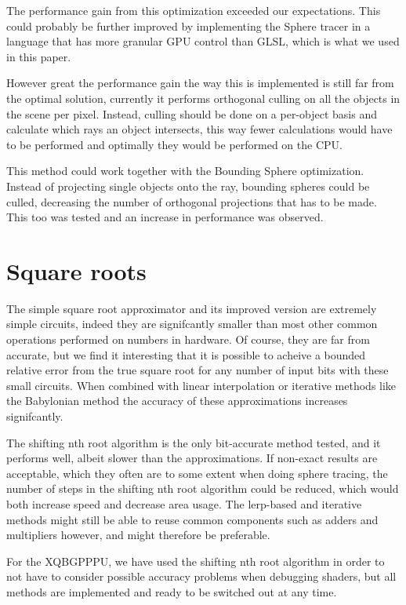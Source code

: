 			The performance gain from this optimization exceeded our 
			expectations. This could probably be further improved by 
			implementing the Sphere tracer in a language that has more granular 
			GPU control than GLSL, which is what we used in this paper.

			However great the performance gain the way this is implemented is still
			far from the optimal solution, currently it performs orthogonal culling
			on all the objects in the scene per pixel. Instead, culling should be
			done on a per-object basis and calculate which rays an object intersects,
			this way fewer calculations would have to be performed and optimally they
			would be performed on the CPU.

			This method could work together with the Bounding Sphere
			optimization. Instead of projecting single objects onto the ray,
			bounding spheres could be culled, decreasing the number of
			orthogonal projections that has to be made. This too was tested and
			an increase in performance was observed.

	\section{Square roots}

		The simple square root approximator and its improved version are
		extremely simple circuits, indeed they are signifcantly smaller than
		most other common operations performed on numbers in hardware. Of
		course, they are far from accurate, but we find it interesting that it
		is possible to acheive a bounded relative error from the true square
		root for any number of input bits with these small circuits. When
		combined with linear interpolation or iterative methods like the
		Babylonian method the accuracy of these approximations increases
		signifcantly.
		
		The shifting nth root algorithm is the only bit-accurate method tested,
		and it performs well, albeit slower than the approximations. If
		non-exact results are acceptable, which they often are to some extent
		when doing sphere tracing, the number of steps in the shifting nth root
		algorithm could be reduced, which would both increase speed and
		decrease area usage. The lerp-based and iterative methods might still
		be able to reuse common components such as adders and multipliers
		however, and might therefore be preferable.
		
		For the XQBGPPPU, we have used the shifting nth root algorithm in order
		to not have to consider possible accuracy problems when debugging
		shaders, but all methods are implemented and ready to be switched out
		at any time.

